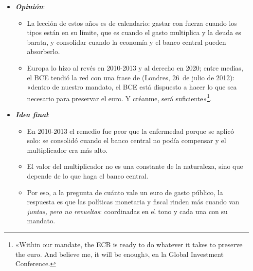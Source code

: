 \documentclass[11pt]{article}
\begin{document}
\begin{itemize}
\begin{itemize}
  \item El déficit, la sostenibilidad y la dominancia ; el diseño de la política monetaria  y sus canales ; la política fiscal y el crecimiento ; la inflación y la deflación ; el ciclo financiero ; la coordinación internacional ; la gobernanza del euro  , donde está también el euro digital, que podría emitirse hacia 2029\nocite{BCE2025EuroDigital}, y la política fiscal en España  .
  \end{itemize}
\item \textbf{\emph{Opinión}}:
  \begin{itemize}
  \item La lección de estos años es de calendario: gastar con fuerza cuando los tipos están en su límite, que es cuando el gasto multiplica y la deuda es barata, y consolidar cuando la economía y el banco central pueden absorberlo.

  \item Europa lo hizo al revés en 2010-2013 y al derecho en 2020; entre medias, el BCE tendió la red con una frase de  (Londres, 26~de julio de 2012): «dentro de nuestro mandato, el BCE está dispuesto a hacer lo que sea necesario para preservar el euro. Y créanme, será suficiente»\footnote{«Within our mandate, the ECB is ready to do whatever it takes to preserve the euro. And believe me, it will be enough», en la Global Investment Conference\nocite{Draghi2012Speech}.}.
  \end{itemize}
\item \textbf{\emph{Idea final}}:
  \begin{itemize}
  \item En 2010-2013 el remedio fue peor que la enfermedad porque se aplicó solo: se consolidó cuando el banco central no podía compensar y el multiplicador era más alto.

  \item El valor del multiplicador no es una constante de la naturaleza, sino que depende de lo que haga el banco central.

  \item Por eso, a la pregunta de cuánto vale un euro de gasto público, la respuesta es que las políticas monetaria y fiscal rinden más cuando van \emph{juntas, pero no revueltas}: coordinadas en el tono y cada una con su mandato.
  \end{itemize}
\end{itemize}
\end{document}
